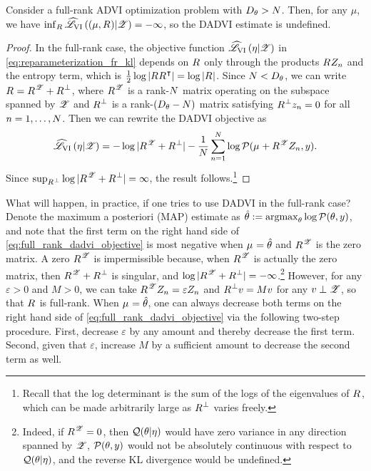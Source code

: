 \begin{theorem}\label{thm:fradvi}
%
Consider a full-rank ADVI optimization problem with $D_{\theta} > N$. Then,
for any $\mu$, we have $\inf_{{R_{}}} \widehat{\mathscr{L}}_{\mathrm{VI}}\left((\mu, {R_{}}) | \mathscr{Z}\right) = -\infty$, so
the DADVI estimate is undefined.
%
\begin{proof}
%
In the full-rank case, the objective function $\widehat{\mathscr{L}}_{\mathrm{VI}}\left(\eta | \mathscr{Z}\right)$ in
\cref{eq:reparameterization_fr_kl} depends on ${R_{}}$ only through the products
${R_{}} Z_n$ and the entropy term, which is $\frac{1}{2} \log |{R_{}}
{R_{}}^\intercal| = \log |{R_{}}|$.  Since $N < D_{\theta}$, we can write ${R_{}} =
{R_{}}^{\mathscr{Z}} + {R_{}}^{\perp}$, where ${R_{}}^{\mathscr{Z}}$ is a rank-$N$ matrix
operating on the subspace spanned by $\mathscr{Z}$ and ${R_{}}^\perp$ is a
rank-$(D_{\theta} - N)$ matrix satisfying ${R_{}}^\perp z_n = 0$ for all
$n=1,\ldots,N$. Then we can rewrite the DADVI objective as
%
\begin{align}
%
\klobj{\eta | \Z}  = -\log |\etar^{\Z} + \etar^{\perp}| -
    \meann \log \p(\etamu + \etar^\Z \z_n, \y). 
    \label{eq:full_rank_dadvi_objective}
%
\end{align}
%
Since $\sup_{{R_{}}^{\perp}} \log |{R_{}}^{\mathscr{Z}} + {R_{}}^{\perp}| = \infty$, the
result follows.\footnote{Recall that the log determinant is the sum of the logs of the
eigenvalues of ${R_{}}$, which can be made arbitrarily large as ${R_{}}^{\perp}$
varies freely.}
%
\end{proof}
%
\end{theorem}

What will happen, in practice, if one tries to use DADVI in the full-rank case?
Denote the maximum a posteriori (MAP) estimate as $\hat\theta :=
\operatorname*{\mathrm{argmax}}_{\theta} \log \mathcal{P}(\theta, y)$, and note that the first term on the right
hand side of \cref{eq:full_rank_dadvi_objective} is most negative when $\mu_{} =
\hat\theta$ and ${R_{}}^{\mathscr{Z}}$ is the zero matrix.  A zero ${R_{}}^{\mathscr{Z}}$ is
impermissible because, when ${R_{}}^{\mathscr{Z}}$ is actually the zero matrix, then
${R_{}}^{\mathscr{Z}} + {R_{}}^{\perp}$ is singular, and $\log |{R_{}}^{\mathscr{Z}} + {R_{}}^{\perp}|
= -\infty$.\footnote{ Indeed, if ${R_{}}^{\mathscr{Z}} = 0$, then $\mathcal{Q}(\theta \vert \eta)$
would have zero variance in any direction spanned by $\mathscr{Z}$, $\mathcal{P}(\theta, y)$
would not be absolutely continuous with respect to $\mathcal{Q}(\theta \vert \eta)$, and
the reverse KL divergence would be undefined.} However, for any $\varepsilon >
0$ and $M > 0$, we can take ${R_{}}^{\mathscr{Z}} Z_n = \varepsilon Z_n$ and ${R_{}}^\perp
v = M v$ for any $v \perp \mathscr{Z}$, so that ${R_{}}$ is full-rank. 
When $\mu_{} = \hat\theta$, one can always decrease both terms on the right hand
side of \cref{eq:full_rank_dadvi_objective} via the following two-step
procedure. First, decrease $\varepsilon$ by any amount and thereby decrease the
first term. Second, given that $\varepsilon$, increase $M$ by a sufficient
amount to decrease the second term as well.

